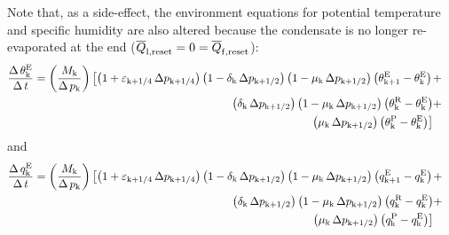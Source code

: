 \documentclass{UMDP_article}
\newcommand{\lc}{\left[}
\newcommand{\rc}{\right]}
\newcommand{\ov}{\overline}
\newcommand{\lp}{\left(}
\newcommand{\rp}{\right)}
\begin{document}
Note that, as a side-effect, the  environment equations for potential
temperature and specific humidity are also altered because the condensate is no
longer re-evaporated at the end (${\ov{Q}}_{\rm{l, reset}} = 0
= {\ov{Q}}_{\rm{f, reset}}$):
%
\begin{eqnarray}
\frac{\Delta \, \theta_{\rm{k}}^{\rm{E}}}{\Delta \, t} = 
\lp \frac{ M_{\rm{k}} }{ \Delta \, p_{\rm{k}} } \rp 
\lc {
\lp { 1 + \varepsilon_{\rm{k} + 1 / 4} \, \Delta p_{\rm{k} + 1 / 4} } \rp
\lp { 1 - \delta_{\rm{k}} \, \Delta p_{\rm{k} + 1 / 2} } \rp
\lp { 1 - \mu_{\rm{k}} \, \Delta p_{\rm{k} + 1 / 2} } \rp 
\lp { \theta_{\rm{k + 1}}^{\rm{E}} - \theta_{\rm{k}}^{\rm{E}} } \rp 
} \right . & + &  \nonumber \\
\lp { \delta_{\rm{k}} \, \Delta p_{\rm{k} + 1 / 2} } \rp
\lp { 1 - \mu_{\rm{k}} \, \Delta p_{\rm{k} + 1 / 2} } \rp 
\lp { \theta_{\rm{k}}^{\rm{R}} - \theta_{\rm{k}}^{\rm{E}} } \rp 
& + &  \nonumber \\
\left . {
\lp { \mu_{\rm{k}} \, \Delta p_{\rm{k} + 1 / 2} } \rp 
\lp { \theta_{\rm{k}}^{\rm{P}} - \theta_{\rm{k}}^{\rm{E}} } \rp 
} \rc & { } &  \label{eq:enviroth}
\end{eqnarray}
%
and 
%
\begin{eqnarray}
\frac{\Delta \, q_{\rm{k}}^{\rm{E}}}{\Delta \, t} = 
\lp \frac{ M_{\rm{k}} }{ \Delta \, p_{\rm{k}} } \rp 
\lc {
\lp { 1 + \varepsilon_{\rm{k} + 1 / 4} \, \Delta p_{\rm{k} + 1 / 4} } \rp
\lp { 1 - \delta_{\rm{k}} \, \Delta p_{\rm{k} + 1 / 2} } \rp
\lp { 1 - \mu_{\rm{k}} \, \Delta p_{\rm{k} + 1 / 2} } \rp 
\lp { q_{\rm{k + 1}}^{\rm{E}} - q_{\rm{k}}^{\rm{E}} } \rp 
} \right . & + &  \nonumber \\
\lp { \delta_{\rm{k}} \, \Delta p_{\rm{k} + 1 / 2} } \rp
\lp { 1 - \mu_{\rm{k}} \, \Delta p_{\rm{k} + 1 / 2} } \rp 
\lp { q_{\rm{k}}^{\rm{R}} - q_{\rm{k}}^{\rm{E}} } \rp 
& + &  \nonumber \\
\left . {
\lp { \mu_{\rm{k}} \, \Delta p_{\rm{k} + 1 / 2} } \rp 
\lp { q_{\rm{k}}^{\rm{P}} - q_{\rm{k}}^{\rm{E}} } \rp 
} \rc & { } &  \label{eq:enviroq}
\end{eqnarray}
\end{document}
